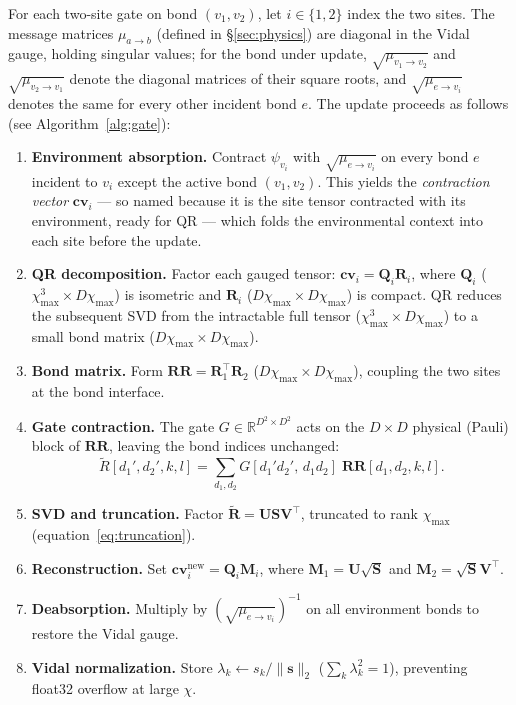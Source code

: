 \documentclass[11pt]{article}
\newcommand{\chimax}{\chi_{\mathrm{max}}}
\begin{document}
For each two-site gate on bond $(v_1, v_2)$, let $i \in \{1,2\}$ index the two
sites. The message matrices $\mu_{a\to b}$ (defined in \S\ref{sec:physics}) are
diagonal in the Vidal gauge, holding singular values; for the bond under
update, $\sqrt{\mu_{v_1\to v_2}}$ and $\sqrt{\mu_{v_2\to v_1}}$ denote the
diagonal matrices of their square roots, and $\sqrt{\mu_{e\to v_i}}$ denotes
the same for every other incident bond $e$.
The update proceeds as follows (see Algorithm~\ref{alg:gate}):
\begin{enumerate}
 \item \textbf{Environment absorption.} Contract $\psi_{v_i}$ with
 $\sqrt{\mu_{e \to v_i}}$ on every bond $e$ incident to $v_i$ except the
 active bond $(v_1,v_2)$. This yields the \emph{contraction vector}
 $\mathbf{cv}_i$ — so named because it is the site tensor contracted
 with its environment, ready for QR — which folds the environmental
 context into each site before the update.
 \item \textbf{QR decomposition.} Factor each gauged tensor:
 $\mathbf{cv}_i = \mathbf{Q}_i \mathbf{R}_i$,
 where $\mathbf{Q}_i$ ($\chimax^3 \times D\chimax$) is isometric and
 $\mathbf{R}_i$ ($D\chimax \times D\chimax$) is compact.
 QR reduces the subsequent SVD from the intractable full tensor
 ($\chimax^3 \times D\chimax$) to a small bond matrix ($D\chimax \times D\chimax$).
 \item \textbf{Bond matrix.} Form $\mathbf{RR} = \mathbf{R}_1^\top \mathbf{R}_2$
 ($D\chimax \times D\chimax$), coupling the two sites at the bond interface.
 \item \textbf{Gate contraction.} The gate $G \in \mathbb{R}^{D^2 \times D^2}$
 acts on the $D \times D$ physical (Pauli) block of $\mathbf{RR}$,
 leaving the bond indices unchanged:
 \[
 \tilde{R}[d_1',d_2',k,l]
 = \sum_{d_1,d_2} G[d_1'd_2',\,d_1d_2]\;\mathbf{RR}[d_1,d_2,k,l].
 \]
 \item \textbf{SVD and truncation.} Factor
 $\tilde{\mathbf{R}} = \mathbf{U}\mathbf{S}\mathbf{V}^\top$,
 truncated to rank $\chimax$ (equation~\eqref{eq:truncation}).
 \item \textbf{Reconstruction.} Set $\mathbf{cv}_i^{\text{new}} = \mathbf{Q}_i \mathbf{M}_i$,
 where $\mathbf{M}_1 = \mathbf{U}\sqrt{\mathbf{S}}$ and
 $\mathbf{M}_2 = \sqrt{\mathbf{S}}\mathbf{V}^\top$.
 \item \textbf{Deabsorption.} Multiply by $(\sqrt{\mu_{e\to v_i}})^{-1}$ on all
 environment bonds to restore the Vidal gauge.
 \item \textbf{Vidal normalization.} Store
 $\lambda_k \leftarrow s_k/\|\mathbf{s}\|_2$ ($\sum_k \lambda_k^2 = 1$),
 preventing float32 overflow at large $\chi$.
\end{enumerate}
\end{document}
